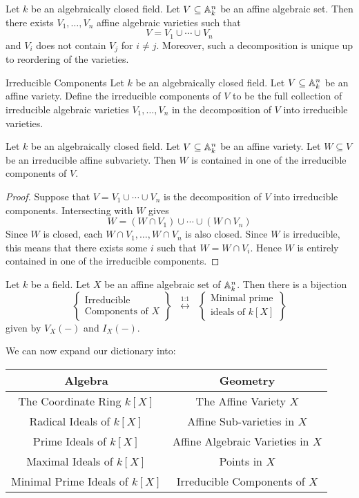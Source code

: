 \documentclass[a4paper]{article}
\begin{document}
\begin{thm}{}{} Let $k$ be an algebraically closed field. Let $V\subseteq\mathbb{A}_k^n$ be an affine algebraic set. Then there exists $V_1,\dots,V_n$ affine algebraic varieties such that $$V=V_1\cup\cdots\cup V_n$$ and $V_i$ does not contain $V_j$ for $i\neq j$. Moreover, such a decomposition is unique up to reordering of the varieties. 
\end{thm}

\begin{defn}{Irreducible Components}{} Let $k$ be an algebraically closed field. Let $V\subseteq\mathbb{A}_k^n$ be an affine variety. Define the irreducible components of $V$ to be the full collection of irreducible algebraic varieties $V_1,\dots,V_n$ in the decomposition of $V$ into irreducible varieties. 
\end{defn}

\begin{lmm}{}{} Let $k$ be an algebraically closed field. Let $V\subseteq\mathbb{A}_k^n$ be an affine variety. Let $W\subseteq V$ be an irreducible affine subvariety. Then $W$ is contained in one of the irreducible components of $V$. \tcbline
\begin{proof}
Suppose that $V=V_1\cup\cdots\cup V_n$ is the decomposition of $V$ into irreducible components. Intersecting with $W$ gives $$W=(W\cap V_1)\cup\cdots\cup(W\cap V_n)$$ Since $W$ is closed, each $W\cap V_1,\dots,W\cap V_n$ is also closed. Since $W$ is irreducible, this means that there exists some $i$ such that $W=W\cap V_i$. Hence $W$ is entirely contained in one of the irreducible components. 
\end{proof}
\end{lmm}

\begin{lmm}{}{} Let $k$ be a field. Let $X$ be an affine algebraic set of $\mathbb{A}_k^n$. Then there is a bijection $$\left\{\substack{\text{Irreducible}\\\text{Components of } X}\right\}\;\;\overset{\text{1:1}}{\longleftrightarrow}\;\;\left\{\substack{\text{Minimal prime}\\\text{ideals of }k[X]}\right\}$$ given by $V_X(-)$ and $I_X(-)$. 
\end{lmm}

We can now expand our dictionary into: \\
\begin{center}\begin{tabular}{c|c}
Algebra & Geometry\\
\hline
The Coordinate Ring $k[X]$ & The Affine Variety $X$\\
Radical Ideals of $k[X]$ & Affine Sub-varieties in $X$\\
Prime Ideals of $k[X]$ & Affine Algebraic Varieties in $X$\\
Maximal Ideals of $k[X]$ & Points in $X$\\
Minimal Prime Ideals of $k[X]$ & Irreducible Components of $X$
\end{tabular}\end{center}
\end{document}
